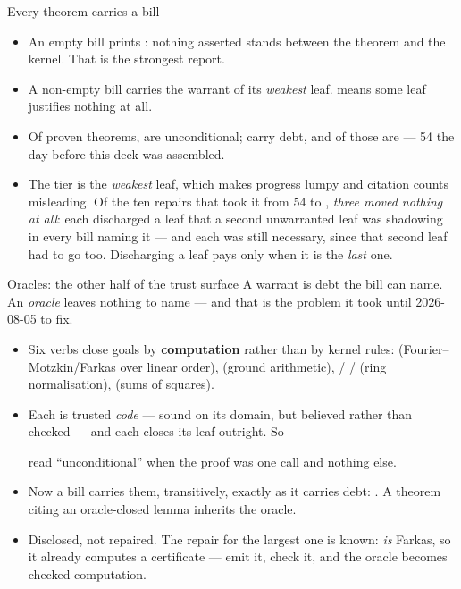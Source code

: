 \documentclass[11pt,aspectratio=169]{beamer}
\begin{document}
\begin{frame}[fragile]{Every theorem carries a bill}
  \vspace{-0.5ex}
  \begin{itemize}\small
    \item An empty bill prints : nothing asserted stands
          between the theorem and the kernel. That is the strongest report.
    \item A non-empty bill carries the warrant of its \emph{weakest} leaf.
           means some leaf justifies nothing at all.
    \item Of \Nproven{} proven theorems, \Nmodzero{} are unconditional;
          \Nbills{} carry debt, and \Ntrustnone{} of those are
           --- 54 the day before this deck was assembled.
    \item The tier is the \emph{weakest} leaf, which makes progress lumpy and
          citation counts misleading. Of the ten repairs that took it from 54
          to \Ntrustnone{}, \emph{three moved nothing at all}: each discharged
          a leaf that a second unwarranted leaf was shadowing in every bill
          naming it --- and each was still necessary, since that second leaf
          had to go too. Discharging a leaf pays only when it is the
          \emph{last} one.
  \end{itemize}
\end{frame}

\begin{frame}{Oracles: the other half of the trust surface}
  A warrant is debt the bill can name. An \emph{oracle} leaves nothing to name
  --- and that is the problem it took until 2026-08-05 to fix.
  \begin{itemize}
    \item Six verbs close goals by \textbf{computation} rather than by kernel
          rules:  (Fourier--Motzkin/Farkas over linear order),
           (ground arithmetic),  /  /
           (ring normalisation),  (sums of squares).
    \item Each is trusted \emph{code} --- sound on its domain, but believed
          rather than checked --- and each closes its leaf outright. So
    \begin{center}\end{center}
          read ``unconditional'' when the proof was one  call and
          nothing else.
    \item Now a bill carries them, transitively, exactly as it carries debt:
          . A theorem citing an oracle-closed lemma
          inherits the oracle.
    \item Disclosed, not repaired. The repair for the largest one is known:
           \emph{is} Farkas, so it already computes a certificate ---
          emit it, check it, and the oracle becomes checked computation.
  \end{itemize}
\end{frame}
\end{document}
